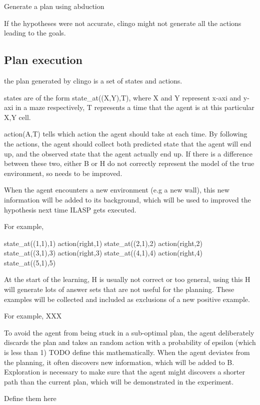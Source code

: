 Generate a plan using abduction

If the hypotheses were not accurate, clingo might not generate all the actions leading to the goals. 

\subsection{Plan execution}
\label{Plan execution}

the plan generated by clingo is a set of states and actions. 

states are of the form state\_at((X,Y),T), where X and Y represent x-axi and y-axi in a maze respectively, T represents a time that the agent is at 
this particular X,Y cell. 

action(A,T) tells which action the agent should take at each time. By following the actions, the agent should collect both predicted state that the 
agent will end up, and the observed state that the agent actually end up. If there is a difference between these two, either B or H do not correctly represent
the model of the true environment, so needs to be improved. 

When the agent encounters a new environment (e.g a new wall), this new information will be added to its background, which will be used to improved the hypothesis 
next time ILASP gets executed. 

For example, 

state\_at((1,1),1) action(right,1)
state\_at((2,1),2) action(right,2)
state\_at((3,1),3) action(right,3)
state\_at((4,1),4) action(right,4)
state\_at((5,1),5)


At the start of the learning, H is usually not correct or too general, using this H will generate lots of answer sets that are not useful for the planning. 
These examples will be collected and included as exclusions of a new positive example. 

For example, 
XXX


To avoid the agent from being stuck in a sub-optimal plan, the agent deliberately discards the plan and takes an random action with a probability of 
epsilon (which is less than 1) TODO define this mathematically. 
When the agent deviates from the planning, it often discovers new information, which will be added to B.
Exploration is necessary to make sure that the agent might discovers a shorter path than the current plan, which will be demonstrated in the experiment. 

Define them here

